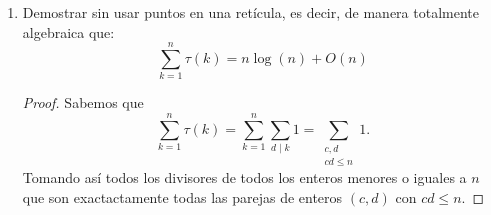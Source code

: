 \documentclass[letterpaper]{article}
\begin{document}
\begin{enumerate}
\begin{proof}
Teniendo como consecuencia que,
\begin{equation}
    \log(n!) - (n \log(n) - n) \ll \log(n) 
\end{equation}

Más aún, por $O$ sabemos que para alguna $C$ se tiene que
\begin{equation}
    \label{eq:4.1}
    |\log(n!) - (n \log(n) - n)| \leq C\log(n) 
\end{equation}

Pero haciendo algunas observaciones en $n \log(n) - n$,
\begin{align*}
    n \log(n) - n
        &= \log(n^n) - n && \text{Potencia en logarítmo } \log_b(x^p) = p\log_b x\\
        &= \log(n^n) - \log(e^n)\\
        &= \log((n/e)^n) && \text{Cociente en logarítmo } \log_b \frac{x}{y} = \log_b x - \log_b y
\end{align*}

Sustituyedo $n \log(n) - n$ en \eqref{eq:4.1} se tiene,
\begin{equation}
    |\log(n!) - \log((n/e)^n)| \leq C\log(n)
\end{equation}

Lo cual por definición de valor absoluto se sigue que,
\begin{equation}
    -C \log(n) \leq \log(n!) - \log((n/e)^n) \leq C\log(n)
\end{equation}

Tomando $\log(n!) - \log((n/e)^n) \leq C \log(n)$ tal que,
\begin{equation}
    e^{\log(n!) - \log((n/e)^n)} \leq e^{\log{n^C}} \quad\iff\quad
    \frac{n!}{(n/e)^n} \leq n^C
\end{equation}

Teniendo así,
\begin{equation}
    n! \leq n^C (n/e)^n
\end{equation}

Y tomando $C=1$ implica que $n! \ll n \left( \frac{n}{e} \right)^n$.

\end{proof}

\item Demostrar sin usar puntos en una retícula, es decir, de manera totalmente algebraica que:
\[
    \sum_{k=1}^{n} \tau(k) = n\log(n) + O(n)
\]

\begin{proof}
Sabemos que
\[
    \sum_{k=1}^{n} \tau(k) = \sum_{k = 1}^n \sum_{d \mid k} 1 = \sum_{\substack{c,d \\ cd \leq n}} 1.
\]
Tomando así todos los divisores de todos los enteros menores o iguales a $n$ que son exactactamente todas las
parejas de enteros $(c,d)$ con $cd \leq n$.


\end{proof}
\end{enumerate}
\end{document}
